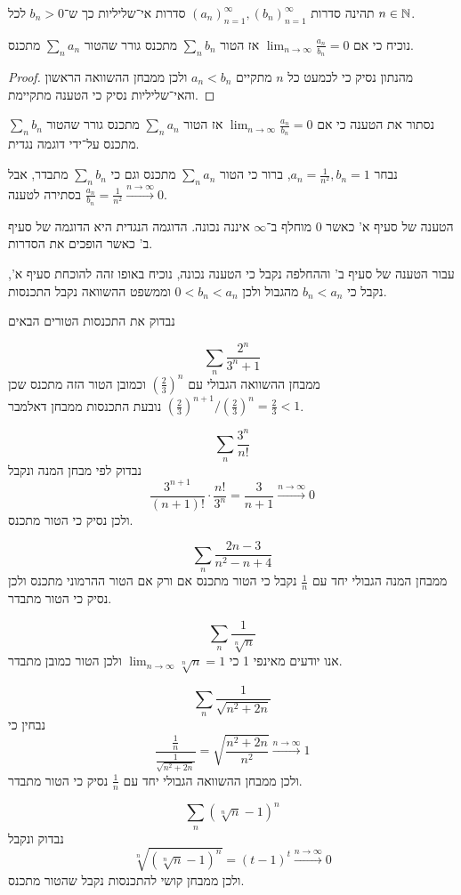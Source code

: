 \Question{}
תהינה סדרות ${(a_n)}_{n = 1}^\infty, {(b_n)}_{n = 1}^\infty$ סדרות אי־שליליות כך ש־$b_n > 0$ לכל $n \in \mathbb{N}$.

\Subquestion{}
נוכיח כי אם $\lim_{n \to \infty} \frac{a_n}{b_n} = 0$ אז הטור $\sum_n b_n$ מתכנס גורר שהטור $\sum_n a_n$ מתכנס.
\begin{proof}
	מהנתון נסיק כי לכמעט כל $n$ מתקיים $a_n < b_n$ ולכן ממבחן ההשוואה הראשון והאי־שליליות נסיק כי הטענה מתקיימת.
\end{proof}

\Subquestion{}
נסתור את הטענה כי אם $\lim_{n \to \infty} \frac{a_n}{b_n} = 0$ אז הטור $\sum_n a_n$ מתכנס גורר שהטור $\sum_n b_n$ מתכנס על־ידי דוגמה נגדית.

נבחר $a_n = \frac{1}{n^2}, b_n = 1$, ברור כי הטור $\sum_n a_n$ מתכנס וגם כי $\sum_n b_n$ מתבדר, אבל $\frac{a_n}{b_n} = \frac{1}{n^2} \xrightarrow{n \to \infty} 0$ בסתירה לטענה.

\Subquestion{}
הטענה של סעיף א' כאשר $0$ מוחלף ב־$\infty$ איננה נכונה.
הדוגמה הנגדית היא הדוגמה של סעיף ב' כאשר הופכים את הסדרות.

עבור הטענה של סעיף ב' וההחלפה נקבל כי הטענה נכונה, נוכיח באופו זהה להוכחת סעיף א', נקבל כי $b_n < a_n$ מהגבול ולכן $0 < b_n < a_n$ וממשפט ההשוואה נקבל התכנסות.

\Question{}
נבדוק את התכנסות הטורים הבאים

\Subquestion{}
\[
	\sum_n \frac{2^n}{3^n + 1}
\]
ממבחן ההשוואה הגבולי עם ${\left(\frac{2}{3}\right)}^n$ וכמובן הטור הזה מתכנס שכן ${(\frac{2}{3})}^{n + 1} / {(\frac{2}{3})}^n = \frac{2}{3} < 1$ נובעת התכנסות ממבחן דאלמבר.

\Subquestion{}
\[
	\sum_n \frac{3^n}{n!}
\]
נבדוק לפי מבחן המנה ונקבל
\[
	\frac{3^{n + 1}}{(n + 1)!}
	\cdot \frac{n!}{3^n}
	= \frac{3}{n + 1} \xrightarrow{n \to \infty} 0
\]
ולכן נסיק כי הטור מתכנס.

\Subquestion{}
\[
	\sum_n \frac{2n - 3}{n^2 - n + 4}
\]
ממבחן המנה הגבולי יחד עם $\frac{1}{n}$ נקבל כי הטור מתכנס אם ורק אם הטור ההרמוני מתכנס ולכן נסיק כי הטור מתבדר.

\Subquestion{}
\[
	\sum_n \frac{1}{\sqrt[n]{n}}
\]
אנו יודעים מאינפי 1 כי $\lim_{n \to \infty} \sqrt[n]{n} = 1$ ולכן הטור כמובן מתבדר.

\Subquestion{}
\[
	\sum_n \frac{1}{\sqrt{n^2 + 2n}}
\]
נבחין כי
\[
	\frac{\frac{1}{n}}{\frac{1}{\sqrt{n^2 + 2n}}} = \sqrt{\frac{n^2 + 2n}{n^2}} \xrightarrow{n \to \infty} 1
\]
ולכן ממבחן ההשוואה הגבולי יחד עם $\frac{1}{n}$ נסיק כי הטור מתבדר.

\Subquestion{}
\[
	\sum_n {(\sqrt[n]{n} - 1)}^n
\]
נבדוק ונקבל
\[
	\sqrt[n]{{(\sqrt[n]{n} - 1)}^n}
	= {(t - 1)}^t
	\xrightarrow{n \to \infty} 0
\]
ולכן ממבחן קושי להתכנסות נקבל שהטור מתכנס.

